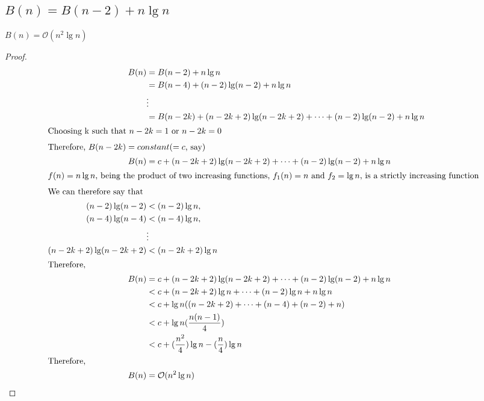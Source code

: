 \documentclass{article}
\begin{document}
\subsection{$B(n) = B(n-2) + n\lg n$}
$B(n) = \mathcal{O}(n^2\lg n)$
\begin{proof}

\begin{align*}
B(n) & = B(n-2) + n\lg n \\
& = B(n-4) + (n-2)\lg(n-2) + n\lg n \\
& \vdots \\
& = B(n-2k) + (n-2k+2)\lg(n-2k+2)+ \cdots + (n-2)\lg(n-2) + n\lg n \\
\intertext{Choosing k such that $n - 2k = 1$ or $ n - 2k = 0$}
\intertext{Therefore, $B(n-2k) = constant$($= c$, say)}
B(n) & = c + (n-2k+2)\lg(n-2k+2)+ \cdots + (n-2)\lg(n-2) + n\lg n \\
\intertext{$f(n) = n\lg n$, being the product of two increasing functions, $f_1(n) = n$ and $f_2 = \lg n$, is a strictly increasing function}
\intertext {We can therefore say that }
(n-2)\lg(n-2) & < (n-2)\lg n, \\
(n-4)\lg(n-4) & < (n-4)\lg n, \\
&\vdots \\
(n-2k+2)\lg(n-2k+2) & < (n-2k+2)\lg n \\
\intertext{Therefore, }
B(n) & = c + (n-2k+2)\lg(n-2k+2)+ \cdots + (n-2)\lg(n-2) + n\lg n \\
& < c + (n-2k+2)\lg n+ \cdots + (n-2)\lg n + n\lg n \\
& < c + \lg n((n-2k+2) + \dots + (n-4) + (n-2) + n) \\
& < c + \lg n(\frac{n(n-1)}{4}) \\
& < c + (\frac{n^2}{4})\lg n - (\frac{n}{4})\lg n \\
\intertext{Therefore, }
B(n) & = \mathcal{O}(n^2\lg n)
\end{align*}

\end{proof}
\end{document}
